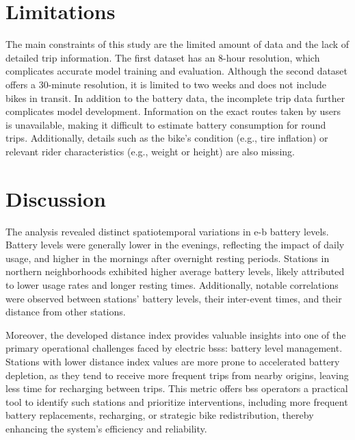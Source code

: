 \section{Limitations}

The main constraints of this study are the limited amount of data and the lack of detailed trip information. The first dataset has an 8-hour resolution, which complicates accurate model training and evaluation. Although the second dataset offers a 30-minute resolution, it is limited to two weeks and does not include bikes in transit.
In addition to the battery data, the incomplete trip data further complicates model development. Information on the exact routes taken by users is unavailable, making it difficult to estimate battery consumption for round trips. Additionally, details such as the bike's condition (e.g., tire inflation) or relevant rider characteristics (e.g., weight or height) are also missing.

\section{Discussion}

The analysis revealed distinct spatiotemporal variations in \ac{e-b} battery levels. Battery levels were generally lower in the evenings, reflecting the impact of daily usage, and higher in the mornings after overnight resting periods. Stations in northern neighborhoods exhibited higher average battery levels, likely attributed to lower usage rates and longer resting times. Additionally, notable correlations were observed between stations' battery levels, their inter-event times, and their distance from other stations.

Moreover, the developed distance index provides valuable insights into one of the primary operational challenges faced by electric \acp{bss}: battery level management. Stations with lower distance index values are more prone to accelerated battery depletion, as they tend to receive more frequent trips from nearby origins, leaving less time for recharging between trips. This metric offers \ac{bss} operators a practical tool to identify such stations and prioritize interventions, including more frequent battery replacements, recharging, or strategic bike redistribution, thereby enhancing the system's efficiency and reliability.

